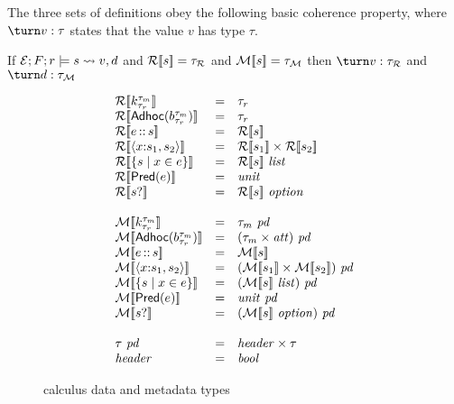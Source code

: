 The three
sets of definitions obey the following basic coherence property, where
$\turn v : \tau$ states that the value $v$ has type $\tau$.

\begin{proposition}
  If $\mathcal{E};F;r \models s \rightsquigarrow v,d$ and ${\cal R}[\![ s ]\!] =
  \tau_{\mathcal{R}}$ and ${\cal M}[\![ s ]\!] = \tau_{\mathcal{M}}$ then $\turn
  v : \tau_{\mathcal{R}}$ and $\turn d : \tau_{\mathcal{M}}$
\end{proposition}


\begin{figure}

\[
\begin{array}{lcl}
\repty{\Sk} & = & \tau_r \\
\repty{\SAdhoc{b}} & = & \tau_r \\
\repty{\SPath{e}{s}} & = & \repty{s} \\
\repty{\SPair{x}{s_1}{s_2}} & = & \repty{s_1} \times \repty{s_2} \\
\repty{\SSetComp{s}{x}{e}} & = & \repty{s}~\typ{list}  \\
\repty{\SPred{e}} & = & \typ{unit} \\
\repty{\SOption{s}} & = & \repty{s}~\typ{option}  \\
\\
\mdty{\Sk} & = & \tau_m~\mathit{pd}\\
\mdty{\SAdhoc{b}} & = & (\tau_m \times \meta)~\mathit{pd}\\
\mdty{\SPath{e}{s}} & = & \mdty{s} \\
\mdty{\SPair{x}{s_1}{s_2}} & = & \pd{\mdty{s_1} \times \mdty{s_2}} \\
\mdty{\SSetComp{s}{x}{e}} & = & \pd{\mdty{s}~\typ{list}}  \\
\mdty{\SPred{e}} & = & \typ{unit}~\mathit{pd}\\
\mdty{\SOption{s}} & = & \pd{\mdty{s}~\typ{option}}  \\
\\
\tau~\mathit{pd} & = & \typ{header} \times \tau \\
\typ{header} & = & \typ{bool} 
\end{array}
\]
\caption{\forest{} calculus data and metadata types}
\label{fig:calculus-types}
\end{figure}
